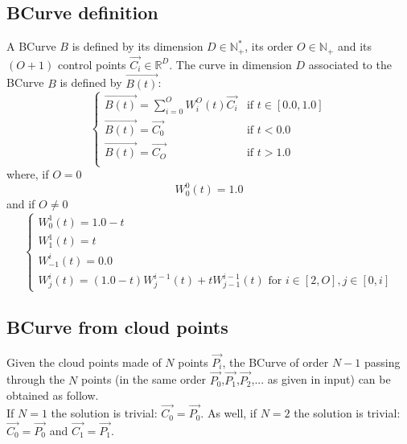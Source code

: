 \subsection{BCurve definition}

A BCurve $B$ is defined by its dimension $D\in\mathbb{N}^*_+$, its order $O\in\mathbb{N_+}$ and its $(O+1)$ control points $\overrightarrow{C_i}\in\mathbb{R}^D$. The curve in dimension $D$ associated to the BCurve $B$ is defined by $\overrightarrow{B(t)}$:\\
\begin{equation}
\left\lbrace
\begin{array}{ll}
\overrightarrow{B(t)}=\sum_{i=0}^OW^O_i(t)\overrightarrow{C_i}&\textrm{if }t\in[0.0,1.0]\\
\overrightarrow{B(t)}=\overrightarrow{C_0}&\textrm{if }t<0.0\\
\overrightarrow{B(t)}=\overrightarrow{C_{O}}&\textrm{if }t>1.0\\
\end{array}
\right.
\end{equation}
where, if $O=0$\\
\begin{equation}
W^0_0(t)=1.0
\end{equation}
and if $O\neq 0$\\
\begin{equation}
\left\lbrace
\begin{array}{l}
W^1_0(t)=1.0-t\\
W^1_1(t)=t\\
W^i_{-1}(t)=0.0\\
W^i_j(t)=(1.0-t)W^{i-1}_j(t)+tW^{i-1}_{j-1}(t)\textrm{ for }i\in[2,O],j\in[0,i]
\end{array}
\right.
\end{equation}

\subsection{BCurve from cloud points}

Given the cloud points made of $N$ points $\overrightarrow{P_i}$, the BCurve of order $N-1$ passing through the $N$ points (in the same order $\overrightarrow{P_0}$,$\overrightarrow{P_1}$,$\overrightarrow{P_2}$,... as given in input) can be obtained as follow.\\

If $N=1$ the solution is trivial: $\overrightarrow{C_0}=\overrightarrow{P_0}$. As well, if $N=2$ the solution is trivial: $\overrightarrow{C_0}=\overrightarrow{P_0}$ and $\overrightarrow{C_1}=\overrightarrow{P_1}$.\\

